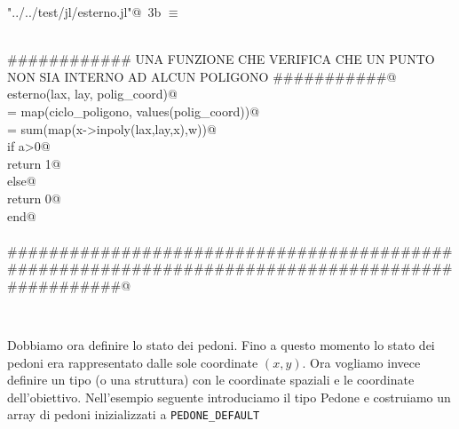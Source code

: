 \documentclass[]{article}
\begin{document}
\begin{flushleft} \small
\begin{minipage}{\linewidth} \label{scrap5}
\protect{}\verb@"../../test/jl/esterno.jl"@\nobreak\ {\footnotesize 3b }$\equiv$
\vspace{-1ex}
\begin{list}{}{} \item
\mbox{}\verb@@\\
\mbox{}\verb@############ UNA FUNZIONE CHE VERIFICA CHE UN PUNTO NON SIA INTERNO AD ALCUN POLIGONO ###########@\\
\mbox{}\verb@function esterno(lax, lay, polig_coord)@\\
\mbox{}\verb@w = map(ciclo_poligono, values(polig_coord))@\\
\mbox{}\verb@a = sum(map(x->inpoly(lax,lay,x),w))@\\
\mbox{}\verb@   if a>0@\\
\mbox{}\verb@      return 1@\\
\mbox{}\verb@   else@\\
\mbox{}\verb@      return 0@\\
\mbox{}\verb@   end@\\
\mbox{}\verb@end@\\
\mbox{}\verb@#################################################################################################@\\
\mbox{}\verb@@{\NWsep}
\end{list}
\vspace{-2ex}
\end{minipage}\\[4ex]
\end{flushleft}
Dobbiamo ora definire lo stato dei pedoni.
Fino a questo momento lo stato dei pedoni era rappresentato dalle sole coordinate $(x,y)$.
Ora vogliamo invece definire un tipo (o una struttura) con le coordinate spaziali e le coordinate dell'obiettivo.
Nell'esempio seguente introduciamo il tipo Pedone e costruiamo un array di pedoni inizializzati a {\tt PEDONE\_DEFAULT}
\end{document}
